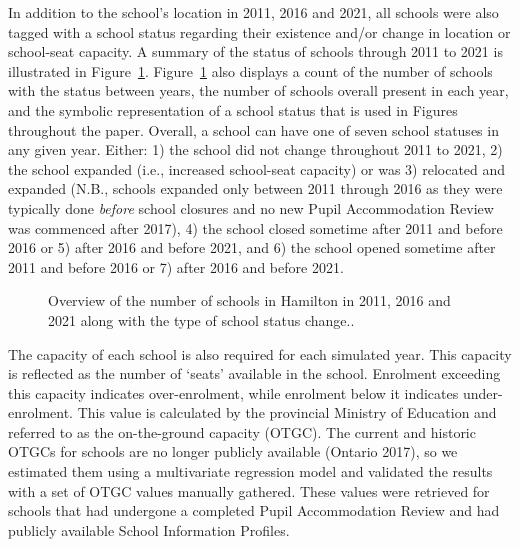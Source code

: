 \documentclass[
default
]{sn-jnl}
\begin{document}
In addition to the school's location in 2011, 2016 and 2021, all schools
were also tagged with a school status regarding their existence and/or
change in location or school-seat capacity. A summary of the status of
schools through 2011 to 2021 is illustrated in Figure~\ref{fig-Fig1}.
Figure~\ref{fig-Fig1} also displays a count of the number of schools
with the status between years, the number of schools overall present in
each year, and the symbolic representation of a school status that is
used in Figures throughout the paper. Overall, a school can have one of
seven school statuses in any given year. Either: 1) the school did not
change throughout 2011 to 2021, 2) the school expanded (i.e., increased
school-seat capacity) or was 3) relocated and expanded (N.B., schools
expanded only between 2011 through 2016 as they were typically done
\emph{before} school closures and no new Pupil Accommodation Review was
commenced after 2017), 4) the school closed sometime after 2011 and
before 2016 or 5) after 2016 and before 2021, and 6) the school opened
sometime after 2011 and before 2016 or 7) after 2016 and before 2021.

\begin{figure}


\caption{\label{fig-Fig1}Overview of the number of schools in Hamilton
in 2011, 2016 and 2021 along with the type of school status change..}

\end{figure}%

The capacity of each school is also required for each simulated year.
This capacity is reflected as the number of `seats' available in the
school. Enrolment exceeding this capacity indicates over-enrolment,
while enrolment below it indicates under-enrolment. This value is
calculated by the provincial Ministry of Education and referred to as
the on-the-ground capacity (OTGC). The current and historic OTGCs for
schools are no longer publicly available (Ontario 2017), so we estimated
them using a multivariate regression model and validated the results
with a set of OTGC values manually gathered. These values were retrieved
for schools that had undergone a completed Pupil Accommodation Review
and had publicly available School Information Profiles.
\end{document}
